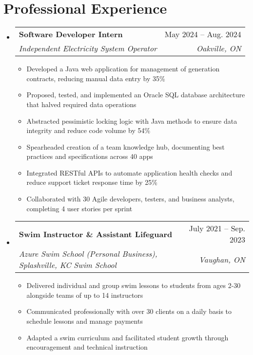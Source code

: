 \documentclass[letterpaper,11pt]{article}
\makeatletter
\newcommand{\resumeItem}[1]{
  \item\small{
    {#1 \vspace{-2pt}}
  }
}
\newcommand{\resumeSubheading}[4]{
  \vspace{-2pt}\item
    \begin{tabular*}{0.97\textwidth}[t]{l@{\extracolsep{\fill}}r}
      \textbf{#1} & #2 \\
      \textit{\small#3} & \textit{\small #4} \\
    \end{tabular*}\vspace{-7pt}
}
\newcommand{\resumeSubSubheading}[2]{
    \item
    \begin{tabular*}{0.97\textwidth}{l@{\extracolsep{\fill}}r}
      \textit{\small#1} & \textit{\small #2} \\
    \end{tabular*}\vspace{-7pt}
}
\newcommand{\resumeSubHeadingListStart}{\begin{itemize}[leftmargin=0.15in, label={}]}
\newcommand{\resumeSubHeadingListEnd}{\end{itemize}}
\newcommand{\resumeItemListStart}{\begin{itemize}}
\newcommand{\resumeItemListEnd}{\end{itemize}\vspace{-5pt}}
\makeatother
\begin{document}
\section{Professional Experience}
  \resumeSubHeadingListStart

    \resumeSubheading
      {Software Developer Intern}{May 2024 -- Aug. 2024}
      {Independent Electricity System Operator}{Oakville, ON}
      \resumeItemListStart
        \resumeItem{Developed a Java web application for management of generation contracts, reducing manual data entry by 35\%}
        \resumeItem{Proposed, tested, and implemented an Oracle SQL database architecture that halved required data operations}
        \resumeItem{Abstracted pessimistic locking logic with Java methods to ensure data integrity and reduce code volume by 54\%}
        \resumeItem{Spearheaded creation of a team knowledge hub, documenting best practices and specifications across 40 apps}
        \resumeItem{Integrated RESTful APIs to automate application health checks and reduce support ticket response time by 25\%}
        \resumeItem{Collaborated with 30 Agile developers, testers, and business analysts, completing 4 user stories per sprint}
      \resumeItemListEnd

    \resumeSubheading
      {Swim Instructor \& Assistant Lifeguard}{July 2021 -- Sep. 2023}
      {Azure Swim School (Personal Business), Splashville, KC Swim School}{Vaughan, ON}
      \resumeItemListStart
        \resumeItem{Delivered individual and group swim lessons to students from ages 2-30 alongside teams of up to 14 instructors}
        \resumeItem{Communicated professionally with over 30 clients on a daily basis to schedule lessons and manage payments}
        \resumeItem{Adapted a swim curriculum and facilitated student growth through encouragement and technical instruction}
      \resumeItemListEnd
      

  \resumeSubHeadingListEnd


\end{document}
